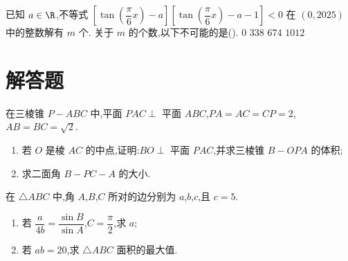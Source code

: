 \begin{problem}
已知 \(a\in\R\),不等式 \(\left[\tan\left(\dfrac\pi6x\right)-a\right]\left[\tan\left(\dfrac\pi6x\right)-a-1\right]<0\) 在 \((0,2025)\) 中的整数解有 \(m\) 个. 关于 \(m\) 的个数,以下不可能的是(\quad).
\choices
    {\(0\)}
    {\(338\)}
    {\(674\)}
    {\(1012\)}
\end{problem}

\section{解答题}

\begin{problem}
在三棱锥 \(P-ABC\) 中,平面 \(PAC\perp\) 平面 \(ABC\),\(PA=AC=CP=2\),\(AB=BC=\sqrt2\).

\begin{enumerate}
\item 若 \(O\) 是棱 \(AC\) 的中点,证明:\(BO\perp\) 平面 \(PAC\),并求三棱锥 \(B-OPA\) 的体积;
\item 求二面角 \(B-PC-A\) 的大小.
\end{enumerate}

\end{problem}

\begin{problem}
在 \(\triangle ABC\) 中,角 \(A\),\(B\),\(C\) 所对的边分别为 \(a\),\(b\),\(c\),且 \(c=5\).
\begin{enumerate}
\item 若 \(\dfrac{a}{4b}=\dfrac{\sin B}{\sin A}\),\(C=\dfrac\pi2\),求 \(a\);
\item 若 \(ab=20\),求 \(\triangle ABC\) 面积的最大值.
\end{enumerate}
\end{problem}

